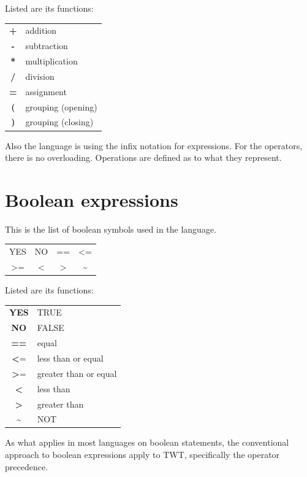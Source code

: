 \documentclass[11pt,a4paper]{report}
\begin{document}
\noindent Listed are its functions:

\begin{center}
\begin{tabular}{ c l }
  \textbf{+} & addition\\
  \textbf{-} & subtraction\\
  \textbf{*} & multiplication\\
  \textbf{/} & division\\
  \textbf{=} & assignment\\
  \textbf{(} & grouping (opening)\\
  \textbf{)} & grouping (closing)
\end{tabular}
\end{center}

Also the language is using the infix notation for expressions. For the
operators, there is no overloading. Operations are defined as to what they
represent.

\section{Boolean expressions}

This is the list of boolean symbols used in the language.

\begin{center}
\begin{tabular}{ c c c c }
 YES & NO & == & \textless = \\
 \textgreater = & \textless & \textgreater & \textasciitilde
\end{tabular}
\end{center}

\noindent Listed are its functions:

\begin{center}
\begin{tabular}{ c l }
  \textbf{YES} & TRUE\\
  \textbf{NO} & FALSE\\
  \textbf{==} & equal\\
  \textbf{\textless}= & less than or equal\\
  \textbf{\textgreater}= & greater than or equal\\
  \textbf{\textless} & less than\\
  \textbf{\textgreater} & greater than\\
  \textbf{\textasciitilde} & NOT
\end{tabular}
\end{center}

As what applies in most languages on boolean statements, the conventional
approach to boolean expressions apply to TWT, specifically the operator
precedence.
\end{document}

